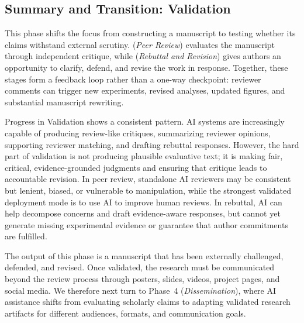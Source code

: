 \subsection{Summary and Transition: Validation}

\label{sec:validation_summary}

This phase shifts the focus from constructing a manuscript to testing whether its claims withstand external scrutiny. \Ssix (\emph{Peer Review}) evaluates the manuscript through independent critique, while \Sseven (\emph{Rebuttal and Revision}) gives authors an opportunity to clarify, defend, and revise the work in response. Together, these stages form a feedback loop rather than a one-way checkpoint: reviewer comments can trigger new experiments, revised analyses, updated figures, and substantial manuscript rewriting.

Progress in Validation shows a consistent pattern. AI systems are increasingly capable of producing review-like critiques, summarizing reviewer opinions, supporting reviewer matching, and drafting rebuttal responses. However, the hard part of validation is not producing plausible evaluative text; it is making fair, critical, evidence-grounded judgments and ensuring that critique leads to accountable revision. In peer review, standalone AI reviewers may be consistent but lenient, biased, or vulnerable to manipulation, while the strongest validated deployment mode is to use AI to improve human reviews. In rebuttal, AI can help decompose concerns and draft evidence-aware responses, but cannot yet generate missing experimental evidence or guarantee that author commitments are fulfilled.

The output of this phase is a manuscript that has been externally challenged, defended, and revised. Once validated, the research must be communicated beyond the review process through posters, slides, videos, project pages, and social media. We therefore next turn to Phase~4 (\emph{Dissemination}), where AI assistance shifts from evaluating scholarly claims to adapting validated research artifacts for different audiences, formats, and communication goals.